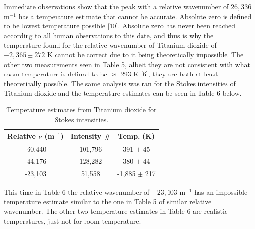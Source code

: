 \documentclass[twocolumn]{article}
\begin{document}
\newline
Immediate observations show that the peak with a relative wavenumber of $26,336$ m$^{-1}$ has a temperature estimate that cannot be accurate. Absolute zero is defined to be lowest temperature possible [10]. Absolute zero has never been reached according to all human observations to this date, and thus is why the temperature found for the relative wavenumber of Titanium dioxide of $-2,365 \pm 272$ K cannot be correct due to it being theoretically impossible. The other two measurements seen in Table 5, albeit they are not consistent with what room temperature is defined to be $\approx$ 293 K [6], they are both at least theoretically possible. The same analysis was ran for the Stokes intensities of Titanium dioxide and the temperature estimates can be seen in Table 6 below.
\begin{table}[htp]
\begin{center}
\begin{tabular}{|c|c|c|}
	\hline \textbf{Relative $\nu$ (m$^{-1}$)} & \textbf{Intensity \#} & \textbf{Temp. (K)} \\ \hline
	-60,440 & 101,796 & 391 $\pm$ 45 \\ \hline
	-44,176 & 128,282 & 380 $\pm$ 44 \\ \hline
	-23,103 & 51,558 & -1,885 $\pm$ 217 \\ \hline
\end{tabular}
\caption{Temperature estimates from Titanium dioxide for Stokes intensities.}
\end{center}
\label{default}
\end{table}%
\newline
This time in Table 6 the relative wavenumber of $-23,103$ m$^{-1}$ has an impossible temperature estimate similar to the one in Table 5 of similar relative wavenumber. The other two temperature estimates in Table 6 are realistic temperatures, just not for room temperature. 
\end{document}
